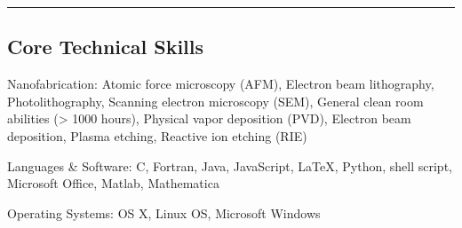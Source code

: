 \documentclass[10pt,letterpaper]{article}
\newenvironment{indentsection}[1]%
{\begin{list}{}%
	{\setlength{\leftmargin}{#1}}%
	\item[]%
}
{\end{list}}
\newcommand{\CPP}
{C\nolinebreak[4]\hspace{-.05em}\raisebox{.22ex}{\footnotesize\bf ++}}
\begin{document}
\hrule
\vspace{-0.4em}
\subsection*{Core Technical Skills}

\begin{indentsection}{\parindent}
\begin{description*}
	\item[Nanofabrication:]
	Atomic force microscopy (AFM), Electron beam lithography, Photolithography, Scanning electron microscopy (SEM), General clean room abilities (> 1000 hours), Physical vapor deposition (PVD), Electron beam deposition, Plasma etching, Reactive ion etching (RIE)
	\item[Languages \& Software:]
	\CPP, Fortran, Java, JavaScript, \LaTeX, Python, shell script, Microsoft Office, Matlab, Mathematica
	\item[Operating Systems:]
	OS X, Linux OS, Microsoft Windows
\end{description*}
\end{indentsection}
\end{document}

